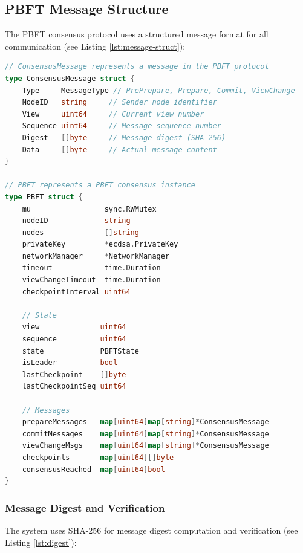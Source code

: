 \documentclass[12pt]{article}
\begin{document}
\subsection{PBFT Message Structure}
The PBFT consensus protocol uses a structured message format for all communication (see Listing \ref{lst:message-struct}):

\begin{lstlisting}[caption={PBFT Message Structure}, label={lst:message-struct}, language=Go]
// ConsensusMessage represents a message in the PBFT protocol
type ConsensusMessage struct {
    Type     MessageType // PrePrepare, Prepare, Commit, ViewChange
    NodeID   string     // Sender node identifier
    View     uint64     // Current view number
    Sequence uint64     // Message sequence number
    Digest   []byte     // Message digest (SHA-256)
    Data     []byte     // Actual message content
}

// PBFT represents a PBFT consensus instance
type PBFT struct {
    mu                 sync.RWMutex
    nodeID             string
    nodes              []string
    privateKey         *ecdsa.PrivateKey
    networkManager     *NetworkManager
    timeout            time.Duration
    viewChangeTimeout  time.Duration
    checkpointInterval uint64

    // State
    view              uint64
    sequence          uint64
    state             PBFTState
    isLeader          bool
    lastCheckpoint    []byte
    lastCheckpointSeq uint64

    // Messages
    prepareMessages   map[uint64]map[string]*ConsensusMessage
    commitMessages    map[uint64]map[string]*ConsensusMessage
    viewChangeMsgs    map[uint64]map[string]*ConsensusMessage
    checkpoints       map[uint64][]byte
    consensusReached  map[uint64]bool
}
\end{lstlisting}

\clearpage
\subsubsection{Message Digest and Verification}
The system uses SHA-256 for message digest computation and verification (see Listing \ref{lst:digest}):
\end{document}
